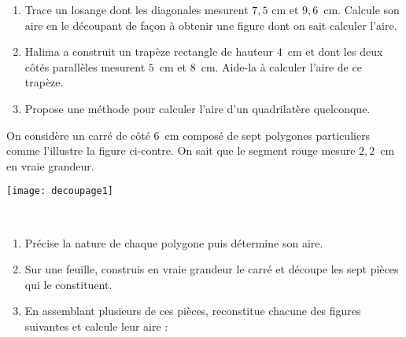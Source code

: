 \begin{activite}
\end{activite}


\newpage

\begin{activite}

\begin{enumerate}
\item Trace un losange dont les diagonales mesurent $7,5$ cm et $9,6$ cm. Calcule son aire en le découpant de façon à obtenir une figure dont on sait calculer l'aire.

\item Halima a construit un trapèze rectangle de hauteur $4$ cm et dont les deux côtés parallèles mesurent $5$ cm et $8$ cm. Aide-la à calculer l’aire de ce trapèze.

\item Propose une méthode pour calculer l'aire d'un quadrilatère quelconque.
\end{enumerate}

\end{activite}


\begin{activite}[Découpages]

\begin{minipage}[c]{0.76\linewidth}
On considère un carré de côté 6 cm composé de sept polygones particuliers comme l'illustre la figure ci-contre. On sait que le segment rouge mesure $2,2$ cm en vraie grandeur.
 \end{minipage} \hfill%
 \begin{minipage}[c]{0.2\linewidth}
  \texttt{[image: decoupage1]}
  \end{minipage} \\

\begin{enumerate}
\item Précise la nature de chaque polygone puis détermine son aire.

\item Sur une feuille, construis en vraie grandeur le carré et découpe les sept pièces qui le constituent.

\item En assemblant plusieurs de ces pièces, reconstitue chacune des figures suivantes et calcule leur aire :

\end{enumerate}
\end{activite}



